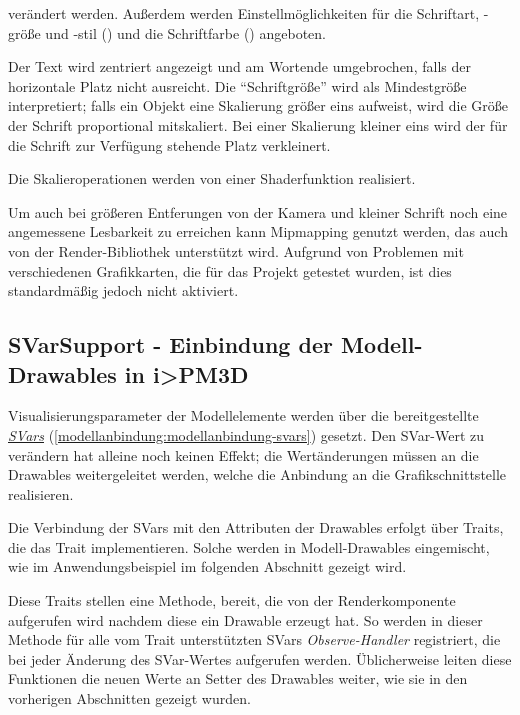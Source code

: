 \documentclass[a4paper,10pt]{sphinxmanual}
\begin{document}
verändert werden. Außerdem werden Einstellmöglichkeiten für die Schriftart, -größe und -stil () und die Schriftfarbe () angeboten.

Der Text wird zentriert angezeigt und am Wortende umgebrochen, falls der horizontale Platz nicht ausreicht.
Die "`Schriftgröße"' wird als Mindestgröße interpretiert; falls ein Objekt eine Skalierung größer eins aufweist, wird die Größe der Schrift proportional mitskaliert.
Bei einer Skalierung kleiner eins wird der für die Schrift zur Verfügung stehende Platz verkleinert.

Die Skalieroperationen werden von einer Shaderfunktion realisiert.

Um auch bei größeren Entferungen von der Kamera und kleiner Schrift noch eine angemessene Lesbarkeit zu erreichen kann Mipmapping genutzt werden, das auch von der Render-Bibliothek unterstützt wird.
Aufgrund von Problemen mit verschiedenen Grafikkarten, die für das Projekt getestet wurden, ist dies standardmäßig jedoch nicht aktiviert.


\subsection{SVarSupport - Einbindung der Modell-Drawables in i\textgreater{}PM3D}
\label{renderbib:svarsupport-einbindung-der-modell-drawables-in-i-pm3d}
Visualisierungsparameter der Modellelemente werden über die  bereitgestellte {\hyperref[modellanbindung:modellanbindung-svars]{\emph{SVars}}} (\autoref*{modellanbindung:modellanbindung-svars}) gesetzt.
Den SVar-Wert zu verändern hat alleine noch keinen Effekt; die Wertänderungen müssen an die Drawables weitergeleitet werden, welche die Anbindung an die Grafikschnittstelle realisieren.

Die Verbindung der SVars mit den Attributen der Drawables erfolgt über Traits, die das Trait  implementieren.
Solche  werden in Modell-Drawables eingemischt, wie im Anwendungsbeispiel im folgenden Abschnitt gezeigt wird.

Diese Traits stellen eine Methode,  bereit, die von der Renderkomponente aufgerufen wird nachdem diese ein Drawable erzeugt hat.
So werden in dieser Methode für alle vom Trait unterstützten SVars \emph{Observe-Handler} registriert, die bei jeder Änderung des SVar-Wertes aufgerufen werden.
Üblicherweise leiten diese Funktionen die neuen Werte an Setter des Drawables weiter, wie sie in den vorherigen Abschnitten gezeigt wurden.
\end{document}
